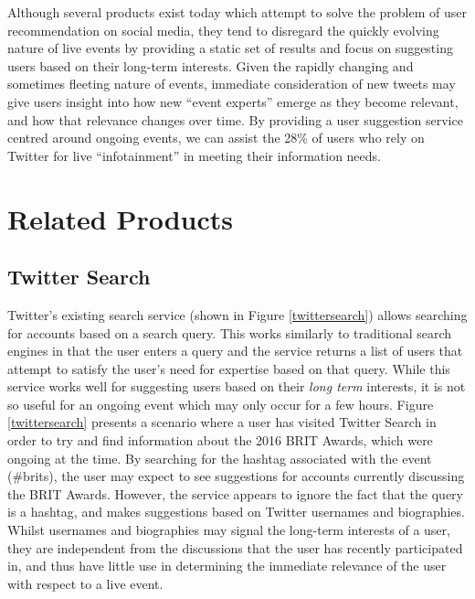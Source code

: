 \documentclass{l4proj}
\begin{document}
Although several products exist today which attempt to solve the problem of user recommendation on social media, they tend to disregard the quickly evolving nature of live events by providing a static set of results and focus on suggesting users based on their long-term interests. Given the rapidly changing and sometimes fleeting nature of events, immediate consideration of new tweets may give users insight into how new ``event experts'' emerge as they become relevant, and how that relevance changes over time. By providing a user suggestion service centred around ongoing events, we can assist the 28\% of users who rely on Twitter for live ``infotainment'' in meeting their information needs.


\section{Related Products}

\subsection{Twitter Search}
Twitter's existing search service (shown in Figure \ref{twittersearch}) allows searching for accounts based on a search query. This works similarly to traditional search engines in that the user enters a query and the service returns a list of users that attempt to satisfy the user's need for expertise based on that query. While this service works well for suggesting users based on their \textit{long term} interests, it is not so useful for an ongoing event which may only occur for a few hours. Figure \ref{twittersearch} presents a scenario where a user has visited Twitter Search in order to try and find information about the 2016 BRIT Awards, which were ongoing at the time. By searching for the hashtag associated with the event (\#brits), the user may expect to see suggestions for accounts currently discussing the BRIT Awards. However, the service appears to ignore the fact that the query is a hashtag, and makes suggestions based on Twitter usernames and biographies. Whilst usernames and biographies may signal the long-term interests of a user, they are independent from the discussions that the user has recently participated in, and thus have little use in determining the immediate relevance of the user with respect to a live event.
\end{document}
